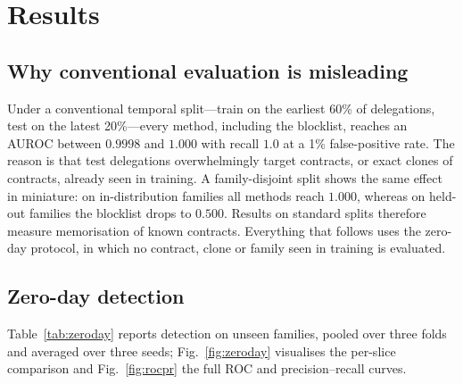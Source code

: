 \section{Results}
\label{sec:results}

\subsection{Why conventional evaluation is misleading}
\label{sec:res-split}
Under a conventional temporal split---train on the earliest 60\% of delegations, test on the latest 20\%---every method, including the blocklist, reaches an AUROC between $0.9998$ and $1.000$ with recall $1.0$ at a 1\% false-positive rate. The reason is that test delegations overwhelmingly target contracts, or exact clones of contracts, already seen in training. A family-disjoint split shows the same effect in miniature: on in-distribution families all methods reach $1.000$, whereas on held-out families the blocklist drops to $0.500$. Results on standard splits therefore measure memorisation of known contracts. Everything that follows uses the zero-day protocol, in which no contract, clone or family seen in training is evaluated.

\subsection{Zero-day detection}
\label{sec:res-zeroday}
Table~\ref{tab:zeroday} reports detection on unseen families, pooled over three folds and averaged over three seeds; Fig.~\ref{fig:zeroday} visualises the per-slice comparison and Fig.~\ref{fig:rocpr} the full ROC and precision--recall curves.

